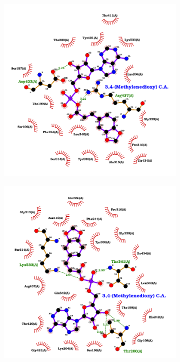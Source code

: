 \documentclass[12pt]{article}
\begin{document}
	\newpage
	
	\FloatBarrier
	\begin{figure}[h!]
		\centering
		\begin{subfigure}[h!]{0.35\textwidth}
			\hspace{2cm}
			\includegraphics[width=\textwidth]{../6/propose/Dock/best.png}
			\caption{}
		\end{subfigure}
		\hfill
		\begin{subfigure}[h!]{0.35\textwidth}
			\hspace{-2cm}
			\includegraphics[width=\textwidth]{../6/propose/Dock/best2.png}

\end{subfigure}
\end{figure}
\end{document}
